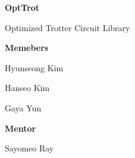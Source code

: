 \documentclass[a4paper,12pt]{article}
\newcommand{\courseName}{2024 IonQ summer Mentoring}
\newcommand{\assignmentTitle}{OptTrot}
\begin{document}
\begin{center}

    \vspace{0.5cm}
    {\Large\bfseries \assignmentTitle \par}
    {\large Optimized Trotter Circuit Library \par}
    \vspace{1cm}
    {
    \noindent
    \begin{minipage}{0.45\textwidth}
        \centering
        \textbf{Memebers}

        Hyunseong Kim

        Hanseo Kim
        
        Gaya Yun
    \end{minipage}
    \begin{minipage}{0.45\textwidth}
        \centering
        \textbf{Mentor}

        Sayomeo Ray
    \end{minipage}
    }
    \begin{abstract}
        OptTrot is a library of generating optimized Trotter circuit for a given hamiltonian.
        Trotterization is a standard way to accomplish time evolution circuit on gate model
        computer, however, their long depth circuit has significantly contributed to 
        the hurdle of practical application.
        In the library, we combined commuting partition method and Pauli Frame search method.
        If the given Pauli term mutually commuted with Pauli Frame axis, then the Clifford gate
        combination was reduced to combinations of CNOT gate. Moreoever their specific decomposition
        is easily derived from Gauss elimination of matrix over module 2 field.
    \end{abstract}
\end{center}


\end{document}
